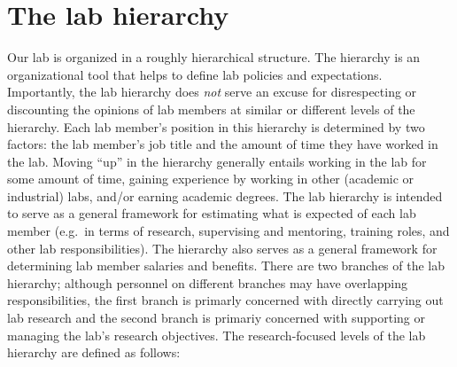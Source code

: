 \documentclass{tufte-book} %
\begin{document}
\section{The lab hierarchy}
Our lab is organized in a roughly hierarchical structure.  The
hierarchy is an organizational tool that helps to define lab policies
and expectations. Importantly, the lab hierarchy does \textit{not}
serve an excuse for disrespecting or discounting the opinions of lab
members at similar or different levels of the hierarchy.  Each lab
member's position in this hierarchy is determined by two factors: the
lab member's job title and the amount of time they have worked in the
lab.  Moving ``up'' in the hierarchy generally entails working in the
lab for some amount of time, gaining experience by working in other
(academic or industrial)
labs, and/or earning academic degrees.  The lab hierarchy is intended
to serve as a general framework for estimating what is expected of
each lab member (e.g.\ in terms of research, supervising and
mentoring, training roles, and other lab responsibilities).  The
hierarchy also serves as a general framework for determining lab
member salaries and benefits.  There are two branches of the lab
hierarchy; although personnel on different branches may have
overlapping responsibilities, the first branch is primarly concerned
with directly carrying out lab research and the second branch is
primariy concerned with supporting or managing the lab's research
objectives.  The research-focused levels of the lab hierarchy are
defined as follows: 
\end{document}
